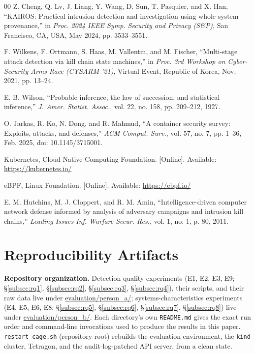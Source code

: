 \documentclass{ieeeaccess}
\begin{document}
\begin{thebibliography}{00}
 Z. Cheng, Q. Lv, J. Liang, Y. Wang, D. Sun, T. Pasquier, and X.
Han, ``KAIROS: Practical intrusion detection and investigation using
whole-system provenance,'' in \emph{Proc. 2024 IEEE Symp. Security and
Privacy (S\&P)}, San Francisco, CA, USA, May 2024, pp. 3533--3551.

 F. Wilkens, F. Ortmann, S. Haas, M. Vallentin, and M. Fischer,
``Multi-stage attack detection via kill chain state machines,'' in \emph{Proc.
3rd Workshop on Cyber-Security Arms Race (CYSARM '21)}, Virtual Event,
Republic of Korea, Nov. 2021, pp. 13--24.

 E. B. Wilson, ``Probable inference, the law of succession, and
statistical inference,'' \emph{J. Amer. Statist. Assoc.}, vol. 22, no. 158,
pp. 209--212, 1927.

 O. Jarkas, R. Ko, N. Dong, and R. Mahmud, ``A container security
survey: Exploits, attacks, and defenses,'' \emph{ACM Comput. Surv.}, vol.
57, no. 7, pp. 1--36, Feb. 2025, doi: 10.1145/3715001.

 Kubernetes, Cloud Native Computing Foundation. [Online].
Available: \url{https://kubernetes.io/}

 eBPF, Linux Foundation. [Online]. Available: \url{https://ebpf.io/}

 E. M. Hutchins, M. J. Cloppert, and R. M. Amin, ``Intelligence-driven
computer network defense informed by analysis of adversary campaigns
and intrusion kill chains,'' \emph{Leading Issues Inf. Warfare Secur. Res.},
vol. 1, no. 1, p. 80, 2011.

\end{thebibliography}

\appendices
\section{Reproducibility Artifacts}
\label{app:reproducibility}

\textbf{Repository organization.} Detection-quality experiments (E1, E2,
E3, E9; \S\ref{subsec:rq1}, \S\ref{subsec:rq2}, \S\ref{subsec:rq3}, \S\ref{subsec:rq4}), their scripts, and their raw data
live under \url{evaluation/person_a/}; systems-characteristics experiments
(E4, E5, E6, E8; \S\ref{subsec:rq5}, \S\ref{subsec:rq6}, \S\ref{subsec:rq7}, \S\ref{subsec:rq8}) live under
\url{evaluation/person_b/}. Each directory's own \texttt{README.md} gives the
exact run order and command-line invocations used to produce the
results in this paper. \texttt{restart\_cage.sh} (repository root) rebuilds
the evaluation environment, the \texttt{kind} cluster, Tetragon, and the
audit-log-patched API server, from a clean state.
\end{document}
